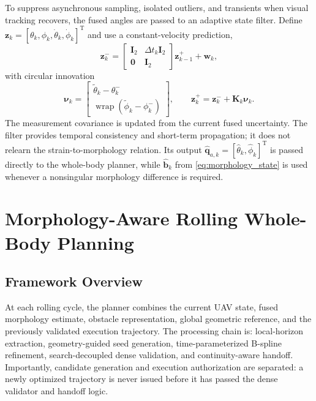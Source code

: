 \documentclass[journal,twoside]{IEEEtran}
\newcommand{\wrap}{\operatorname{wrap}}
\begin{document}
To suppress asynchronous sampling, isolated outliers, and transients when visual tracking recovers, the fused angles are passed to an adaptive state filter. Define $\mathbf z_k=[\theta_k,\phi_k,\dot\theta_k,\dot\phi_k]^{\mathrm T}$ and use a constant-velocity prediction,
\begin{equation}
\mathbf z_k^-=
\begin{bmatrix}
\mathbf I_2&\Delta t_k\mathbf I_2\\
\mathbf 0&\mathbf I_2
\end{bmatrix}\mathbf z_{k-1}^+ +\mathbf w_k,
\label{eq:filter_predict}
\end{equation}
with circular innovation
\begin{equation}
\boldsymbol\nu_k=
\begin{bmatrix}
\tilde\theta_k-\theta_k^-\\
\wrap(\tilde\phi_k-\phi_k^-)
\end{bmatrix},
\qquad
\mathbf z_k^+=\mathbf z_k^-+\mathbf K_k\boldsymbol\nu_k.
\label{eq:filter_update}
\end{equation}
The measurement covariance is updated from the current fused uncertainty. The filter provides temporal consistency and short-term propagation; it does not relearn the strain-to-morphology relation. Its output $\hat{\mathbf q}_{a,k}=[\hat\theta_k,\hat\phi_k]^{\mathrm T}$ is passed directly to the whole-body planner, while $\hat{\mathbf b}_k$ from \eqref{eq:morphology_state} is used whenever a nonsingular morphology difference is required.

\section{Morphology-Aware Rolling Whole-Body Planning}
\subsection{Framework Overview}
At each rolling cycle, the planner combines the current UAV state, fused morphology estimate, obstacle representation, global geometric reference, and the previously validated execution trajectory. The processing chain is: local-horizon extraction, geometry-guided seed generation, time-parameterized B-spline refinement, search-decoupled dense validation, and continuity-aware handoff. Importantly, candidate generation and execution authorization are separated: a newly optimized trajectory is never issued before it has passed the dense validator and handoff logic.
\end{document}
